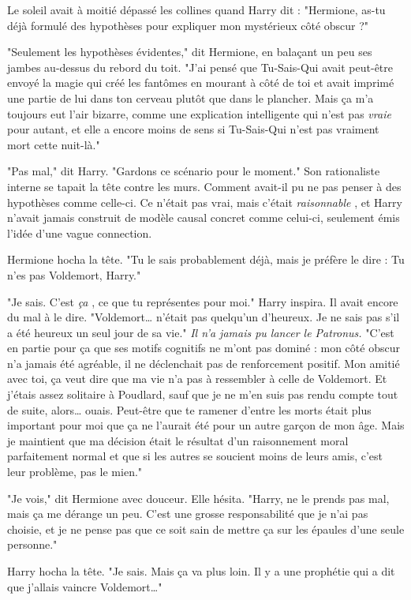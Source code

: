 Le soleil avait à moitié dépassé les collines quand Harry dit : "Hermione, as-tu déjà formulé des hypothèses pour expliquer mon mystérieux côté obscur ?"

"Seulement les hypothèses évidentes," dit Hermione, en balaçant un peu ses jambes au-dessus du rebord du toit. "J'ai pensé que Tu-Sais-Qui avait peut-être envoyé la magie qui créé les fantômes en mourant à côté de toi et avait imprimé une partie de lui dans ton cerveau plutôt que dans le plancher. Mais ça m'a toujours eut l'air bizarre, comme une explication intelligente qui n'est pas \emph{vraie}  pour autant, et elle a encore moins de sens si Tu-Sais-Qui n'est pas vraiment mort cette nuit-là."

"Pas mal," dit Harry. "Gardons ce scénario pour le moment." Son rationaliste interne se tapait la tête contre les murs. Comment avait-il pu ne pas penser à des hypothèses comme celle-ci. Ce n'était pas vrai, mais c'était \emph{raisonnable} , et Harry n'avait jamais construit de modèle causal concret comme celui-ci, seulement émis l'idée d'une vague connection.

Hermione hocha la tête. "Tu le sais probablement déjà, mais je préfère le dire : Tu n'es pas Voldemort, Harry."

"Je sais. C'est \emph{ça} , ce que tu représentes pour moi." Harry inspira. Il avait encore du mal à le dire. "Voldemort… n'était pas quelqu'un d'heureux. Je ne sais pas s'il a été heureux un seul jour de sa vie." \emph{Il n'a jamais pu lancer le Patronus.}  "C'est en partie pour ça que ses motifs cognitifs ne m'ont pas dominé : mon côté obscur n'a jamais été agréable, il ne déclenchait pas de renforcement positif. Mon amitié avec toi, ça veut dire que ma vie n'a pas à ressembler à celle de Voldemort. Et j'étais assez solitaire à Poudlard, sauf que je ne m'en suis pas rendu compte tout de suite, alors… ouais. Peut-être que te ramener d'entre les morts était plus important pour moi que ça ne l'aurait été pour un autre garçon de mon âge. Mais je maintient que ma décision était le résultat d'un raisonnement moral parfaitement normal et que si les autres se soucient moins de leurs amis, c'est leur problème, pas le mien."

"Je vois," dit Hermione avec douceur. Elle hésita. "Harry, ne le prends pas mal, mais ça me dérange un peu. C'est une grosse responsabilité que je n'ai pas choisie, et je ne pense pas que ce soit sain de mettre ça sur les épaules d'une seule personne."

Harry hocha la tête. "Je sais. Mais ça va plus loin. Il y a une prophétie qui a dit que j'allais vaincre Voldemort…"


